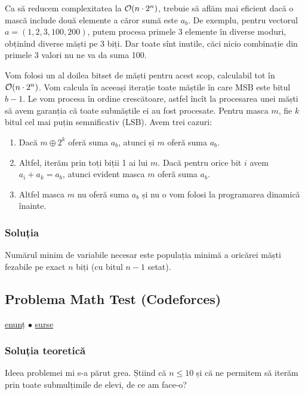 \documentclass[../main.tex]{subfiles}
\begin{document}
Ca să reducem complexitatea la $\mathcal{O}(n \cdot 2^n)$, trebuie să aflăm mai eficient dacă o mască include două elemente a căror sumă este $a_b$. De exemplu, pentru vectorul $a = (1, 2, 3, 100, 200)$, putem procesa primele 3 elemente în diverse moduri, obținînd diverse măști pe 3 biți. Dar toate sînt inutile, căci nicio combinație din primele 3 valori nu ne va da suma 100.

Vom folosi un al doilea bitset de măști pentru acest scop, calculabil tot în $\mathcal{O}(n \cdot 2^n)$. Vom calcula în aceeași iterație toate măștile în care MSB este bitul $b-1$. Le vom procesa în ordine crescătoare, astfel încît la procesarea unei măști să avem garanția că toate submăștile ei au fost procesate. Pentru masca $m$, fie $k$ bitul cel mai puțin semnificativ (LSB). Avem trei cazuri:

\begin{enumerate}
  \item Dacă $m \oplus 2^k$ oferă suma $a_b$, atunci și $m$ oferă suma $a_b$.

  \item Altfel, iterăm prin toți biții 1 ai lui $m$. Dacă pentru orice bit $i$ avem $a_i + a_k = a_b$, atunci evident masca $m$ oferă suma $a_b$.

  \item Altfel masca $m$ nu oferă suma $a_b$ și nu o vom folosi la programarea dinamică înainte.
\end{enumerate}

\subsubsection*{Soluția}

Numărul minim de variabile necesar este populația minimă a oricărei măști fezabile pe exact $n$ biți (cu bitul $n-1$ setat).


\subsection{Problema Math Test (Codeforces)}
\label{problem:math-test}

\href{https://codeforces.com/contest/1622/problem/E}{enunț}
$\bullet$
\hyperref[code:math-test]{surse}

\subsubsection*{Soluția teoretică}

Ideea problemei mi s-a părut grea. Știind că $n \leq 10$ și că ne permitem să iterăm prin toate submulțimile de elevi, de ce am face-o?
\end{document}

